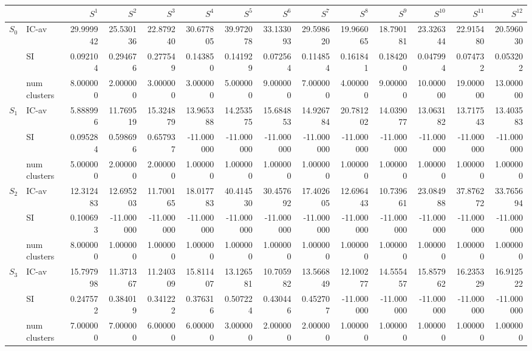 \begin{tabular}{llrrrrrrrrrrrr}
\toprule
 &  & $S^{1}$ & $S^{2}$ & $S^{3}$ & $S^{4}$ & $S^{5}$ & $S^{6}$ & $S^{7}$ & $S^{8}$ & $S^{9}$ & $S^{10}$ & $S^{11}$ & $S^{12}$ \\
\midrule
\multirow[c]{3}{*}{$S_{0}$} & IC-av & 29.999942 & 25.530136 & 22.879240 & 30.677805 & 39.972078 & 33.133093 & 29.598620 & 19.966065 & 18.790181 & 23.326344 & 22.915480 & 20.596030 \\
 & SI & 0.092104 & 0.294676 & 0.277549 & 0.143850 & 0.141929 & 0.072564 & 0.114854 & 0.161841 & 0.184200 & 0.047994 & 0.074732 & 0.053202 \\
 & num clusters & 8.000000 & 2.000000 & 3.000000 & 3.000000 & 5.000000 & 9.000000 & 7.000000 & 4.000000 & 9.000000 & 10.000000 & 19.000000 & 13.000000 \\
\multirow[c]{3}{*}{$S_{1}$} & IC-av & 5.888996 & 11.769519 & 15.324879 & 13.965388 & 14.253575 & 15.684853 & 14.926784 & 20.781202 & 14.039077 & 13.063182 & 13.717543 & 13.403583 \\
 & SI & 0.095284 & 0.598696 & 0.657937 & -11.000000 & -11.000000 & -11.000000 & -11.000000 & -11.000000 & -11.000000 & -11.000000 & -11.000000 & -11.000000 \\
 & num clusters & 5.000000 & 2.000000 & 2.000000 & 1.000000 & 1.000000 & 1.000000 & 1.000000 & 1.000000 & 1.000000 & 1.000000 & 1.000000 & 1.000000 \\
\multirow[c]{3}{*}{$S_{2}$} & IC-av & 12.312483 & 12.695203 & 11.700165 & 18.017783 & 40.414530 & 30.457692 & 17.402605 & 12.696443 & 10.739661 & 23.084988 & 37.876272 & 33.765694 \\
 & SI & 0.100693 & -11.000000 & -11.000000 & -11.000000 & -11.000000 & -11.000000 & -11.000000 & -11.000000 & -11.000000 & -11.000000 & -11.000000 & -11.000000 \\
 & num clusters & 8.000000 & 1.000000 & 1.000000 & 1.000000 & 1.000000 & 1.000000 & 1.000000 & 1.000000 & 1.000000 & 1.000000 & 1.000000 & 1.000000 \\
\multirow[c]{3}{*}{$S_{3}$} & IC-av & 15.797998 & 11.371367 & 11.240309 & 15.811407 & 13.126581 & 10.705982 & 13.566849 & 12.100277 & 14.555457 & 15.857962 & 16.235329 & 16.912522 \\
 & SI & 0.247572 & 0.384019 & 0.341222 & 0.376316 & 0.507224 & 0.430446 & 0.452707 & -11.000000 & -11.000000 & -11.000000 & -11.000000 & -11.000000 \\
 & num clusters & 7.000000 & 7.000000 & 6.000000 & 6.000000 & 3.000000 & 2.000000 & 2.000000 & 1.000000 & 1.000000 & 1.000000 & 1.000000 & 1.000000 \\
\bottomrule
\end{tabular}
